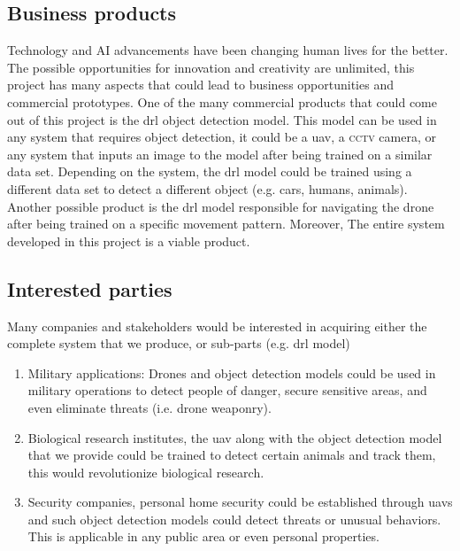 \documentclass[../main.tex]{subfiles}
\begin{document}
\subsection{Business products}
	Technology and AI advancements have been changing human lives for the better.
	The possible opportunities for innovation and creativity are unlimited, this
	project has many aspects that could lead to business opportunities and commercial
	prototypes. 
	One of the many commercial products that could come out of this project is
	the \gls{drl} object detection model. This model can be used in any system
	that requires object detection, it could be a \gls{uav}, a \textsc{cctv} camera, or
	any system that inputs an image to the model after being trained on a similar 
	data set.
	Depending on the system, the \gls{drl} model could be trained using a different
	data set to detect a different object (e.g. cars, humans, animals).
	Another possible product is the \gls{drl} model responsible for navigating the
	drone after being trained on a specific movement pattern.
	Moreover, The entire system developed in this project is a viable product.

\subsection{Interested parties}
	Many companies and stakeholders would be interested in acquiring either the
	complete system that we produce, or sub-parts (e.g. \gls{drl} model)
	\begin{enumerate}
		\item Military applications: Drones and object detection models could 
		be used in military operations to detect people of danger, secure 
		sensitive areas, and even eliminate threats (i.e. drone weaponry).
		
		\item Biological research institutes, the \gls{uav} along with the object
		detection model that we provide could be trained to detect certain animals 
		and track them, this would revolutionize biological research.
		
		\item Security companies, personal home security could be established through
		\glspl{uav} and such object detection models could detect threats or unusual
		behaviors. This is applicable in any public area or even personal properties.		
		
	\end{enumerate}
\end{document}

